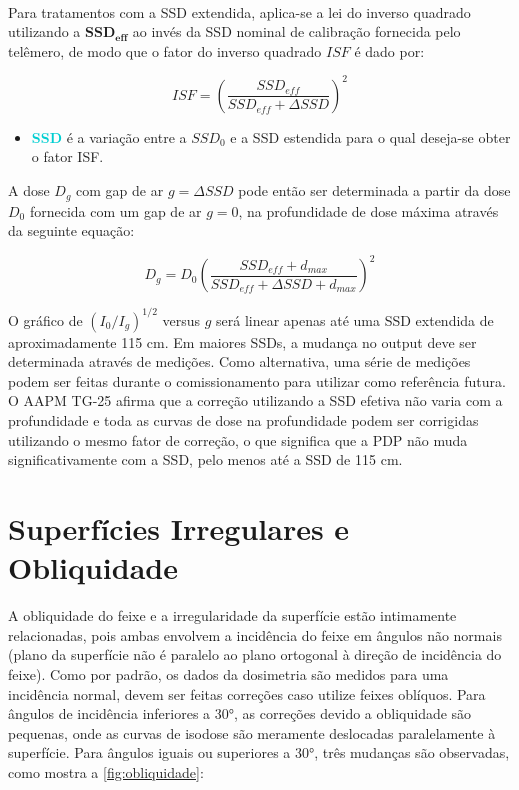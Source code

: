 \documentclass[11pt,a4paper]{article}
\newcounter{exemplo}
\begin{document}
	\

	Para tratamentos com a SSD extendida, aplica-se a lei do inverso quadrado utilizando a $\mathbf{SSD_{eff}}$ ao invés da SSD nominal de calibração fornecida pelo telêmero, de modo que o fator do inverso quadrado $ISF$ é dado por:

	\begin{equation}
		ISF = \left(\frac{SSD_{eff}}{SSD_{eff} + \Delta SSD}\right)^2
	\end{equation}

	\begin{exemplo}[onde,]
		\begin{itemize}
			\item \textcolor{DarkTurquoise}{\textbf{\Delta SSD}} é a variação entre a $SSD_0$ e a SSD estendida para o qual deseja-se obter o fator ISF.
		\end{itemize}
	\end{exemplo}

	A dose $D_g$ com gap de ar $g = \Delta SSD$ pode então ser determinada a partir da dose $D_0$ fornecida com um gap de ar $g = 0$, na profundidade de dose máxima através da seguinte equação:

	\begin{equation}
		D_g = D_0 \left(\frac{SSD_{eff} + d_{max}}{SSD_{eff} + \Delta SSD + d_{max} }\right)^2
	\end{equation}
	
	O gráfico de $(I_0/I_g)^{1/2}$ versus $g$ será linear apenas até uma SSD extendida de aproximadamente 115 cm. Em maiores SSDs, a mudança no output deve ser determinada através de medições. Como alternativa, uma série de medições podem ser feitas durante o comissionamento para utilizar como referência futura. O AAPM TG-25 afirma que a correção utilizando a SSD efetiva não varia com a profundidade e toda as curvas de dose na profundidade podem ser corrigidas utilizando o mesmo fator de correção, o que significa que a PDP não muda significativamente com a SSD, pelo menos até a SSD de 115 cm.

\section{Superfícies Irregulares e Obliquidade}

	A obliquidade do feixe e a irregularidade da superfície estão intimamente relacionadas, pois ambas envolvem a incidência do feixe em ângulos não normais (plano da superfície não é paralelo ao plano ortogonal à direção de incidência do feixe). Como por padrão, os dados da dosimetria são medidos para uma incidência normal, devem ser feitas correções caso utilize feixes oblíquos. Para ângulos de incidência inferiores a \ang{30}, as correções devido a obliquidade são pequenas, onde as curvas de isodose são meramente deslocadas paralelamente à superfície. Para ângulos iguais ou superiores a \ang{30}, três mudanças são observadas, como mostra a \ref{fig:obliquidade}:
\end{document}
